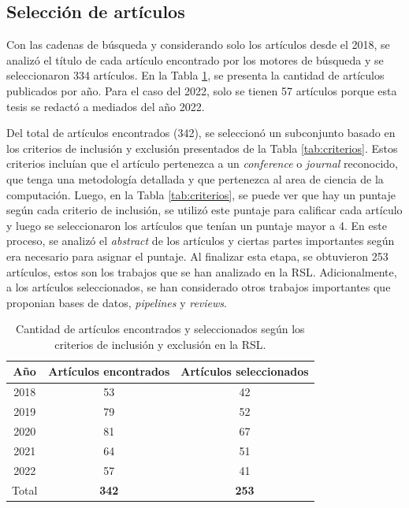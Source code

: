 \subsection{Selección de artículos}

Con las cadenas de búsqueda y considerando solo los artículos desde el 2018, se analizó el título de cada artículo encontrado por los motores de búsqueda y se seleccionaron 334 artículos. En la Tabla \ref{tab:number_papers}, se presenta la cantidad de artículos publicados por año. Para el caso del 2022, solo se tienen 57 artículos porque esta tesis se redactó a mediados del año 2022. 

Del total de artículos encontrados (342), se seleccionó un subconjunto basado en los criterios de inclusión y exclusión presentados de la Tabla  \ref{tab:criterios}. Estos criterios incluían que el artículo pertenezca a un \textit{conference} o \textit{journal} reconocido, que tenga una metodología detallada y que pertenezca al area de ciencia de la computación. Luego, en la Tabla \ref{tab:criterios}, se puede ver que hay un puntaje según cada criterio de inclusión, se utilizó este puntaje para calificar cada artículo y luego se seleccionaron los artículos que tenían un puntaje mayor a 4. En este proceso, se analizó el \textit{abstract} de los artículos y ciertas partes importantes según era necesario para asignar el puntaje. Al finalizar esta etapa, se obtuvieron 253 artículos, estos son los trabajos que se han analizado en la RSL. Adicionalmente, a los artículos seleccionados, se han considerado otros trabajos importantes que proponian bases de datos, \textit{pipelines} y \textit{reviews}.




\begin{table}[H]
	\begin{center}
		\caption{Cantidad de artículos encontrados y seleccionados según los criterios de inclusión y exclusión en la RSL.}
		\label{tab:number_papers}
		\setlength{\tabcolsep}{0.5em} %
		{\renewcommand{\arraystretch}{1.2}%
			\begin{tabular}{ccc}
					\textbf{Año} & \textbf{Artículos encontrados} & \textbf{Artículos seleccionados}\\ \hline
				    2018 & 53 & 42 \\
				    2019 & 79 & 52 \\
				    2020 & 81 & 67 \\
				    2021 & 64 & 51 \\
				    2022 & 57 & 41 \\ \hline
				    Total & \textbf{342} & \textbf{253} \\
			\end{tabular}
		}
	\end{center}
\end{table}

